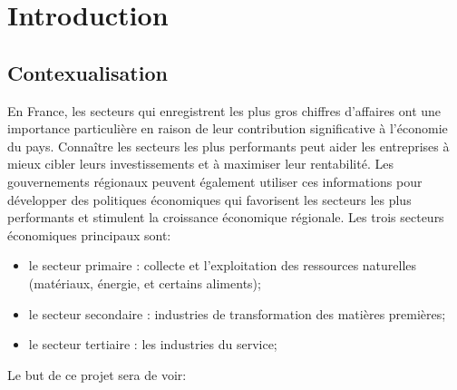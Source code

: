 \documentclass[mstat,12pt]{unswthesis}
\begin{document}
\par

\bigskip



\afterpreface





%
%






\hypertarget{introduction}{%
\chapter{Introduction}\label{introduction}}

\hypertarget{contexualisation}{%
\section{Contexualisation}\label{contexualisation}}

En France, les secteurs qui enregistrent les plus gros chiffres
d'affaires ont une importance particulière en raison de leur
contribution significative à l'économie du pays. Connaître les secteurs
les plus performants peut aider les entreprises à mieux cibler leurs
investissements et à maximiser leur rentabilité. Les gouvernements
régionaux peuvent également utiliser ces informations pour développer
des politiques économiques qui favorisent les secteurs les plus
performants et stimulent la croissance économique régionale. Les trois
secteurs économiques principaux sont: \medskip

\begin{itemize}
  \item le secteur primaire : collecte et l'exploitation des ressources naturelles (matériaux, énergie, et certains aliments);
  \item le secteur secondaire : industries de transformation des matières premières;
  \item le secteur tertiaire : les industries du service;
  \end{itemize}

\medskip

Le but de ce projet sera de voir:
\end{document}
